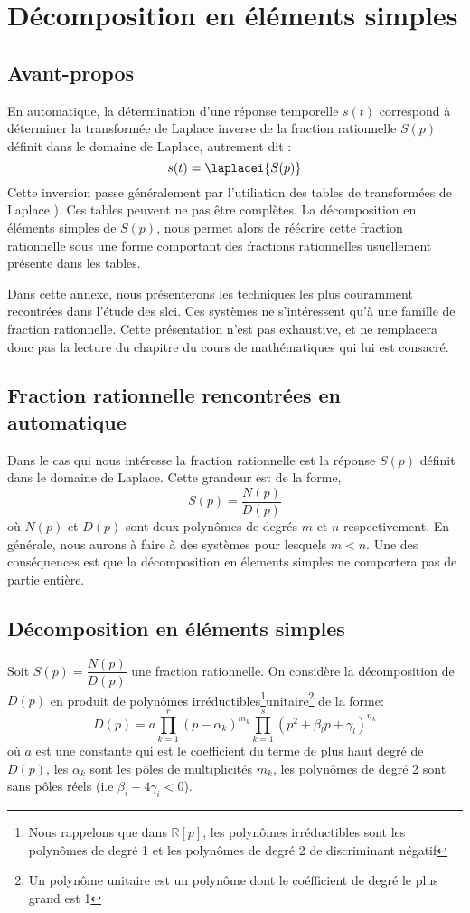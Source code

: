 \chapter{Décomposition en éléments simples\label{annexe-DES}}

\section{Avant-propos}
En automatique, la détermination d'une réponse temporelle $s(t)$
correspond à déterminer la transformée 
de Laplace inverse de la fraction rationnelle $S(p)$ 
définit dans le domaine de Laplace, autrement dit :
$$
s(t)=\laplacei{S(p)}
$$
Cette inversion passe généralement par l'utiliation des tables de transformées de Laplace ).
Ces tables peuvent ne pas être complètes. La décomposition en 
éléments simples de $S(p)$, nous permet alors de 
réécrire cette fraction rationnelle sous une forme comportant 
des fractions rationnelles usuellement présente dans les tables.

Dans cette annexe, nous présenterons les techniques les plus couramment
recontrées dans l'étude des \gls{slci}. Ces systèmes ne s'intéressent qu'à 
une famille de fraction rationnelle.
Cette présentation n'est pas exhaustive, et ne remplacera donc 
pas la lecture du chapitre du cours de mathématiques qui lui est consacré.

\section{Fraction rationnelle rencontrées en automatique}
Dans le cas qui nous intéresse la fraction rationnelle est la réponse $S(p)$ 
définit dans le domaine de Laplace.
Cette grandeur est de la forme,
$$
S(p)=\dfrac{N(p)}{D(p)}
$$
où $N(p)$ et $D(p)$ sont deux polynômes de degrés $m$ et $n$ respectivement.
En générale, nous aurons à faire à des systèmes pour lesquels $m<n$. 
Une des conséquences est que la décomposition en élements simples ne comportera
pas de partie entière.

\section{Décomposition en éléments simples}

Soit $S(p)=\dfrac{N(p)}{D(p)}$ une fraction rationnelle. On considère la décomposition 
de $D(p)$ en produit de polynômes irréductibles\footnote{Nous rappelons que 
dans $\mathbb{R}[p]$, les polynômes irréductibles sont 
les polynômes de degré 1 et les polynômes de degré 2 de discriminant négatif}unitaire\footnote{Un polynôme unitaire est un polynôme dont le coéfficient de degré le plus grand est 1}
de la forme:
$$
D(p)=a\prod_{k=1}^r(p-\alpha_k)^{m_k}\prod_{k=1}^s(p^2+\beta_lp+\gamma_l)^{n_k}
$$
où $a$ est une constante qui est le coefficient du terme de plus haut degré de $D(p)$, les $\alpha_k$
sont les pôles de multiplicités $m_k$,  les polynômes de degré 2 sont sans pôles réels (i.e $\beta_i-4\gamma_i<0$).

